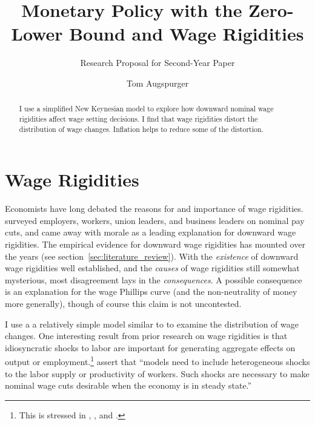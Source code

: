 \documentclass[12pt,a4paper]{scrartcl}            %
\begin{document}
\makeatletter
\def\blfootnote{\xdef\@thefnmark{}\@footnotetext}
\makeatother



\title{Monetary Policy with the Zero-Lower Bound and Wage Rigidities}
\subtitle{Research Proposal for Second-Year Paper}
\author{Tom Augspurger}                               %


\begin{abstract}
I use a simplified New Keynesian model to explore how downward nominal wage rigidities affect wage setting decisions.
I find that wage rigidities distort the distribution of wage changes.
Inflation helps to reduce some of the distortion.

\end{abstract}

\section{Wage Rigidities}
\label{sec:introduction}

Economists have long debated the reasons for and importance of wage rigidities.
\cite{bewley_2007} surveyed employers, workers, union leaders, and business leaders on nominal pay cuts, and came away with morale as a leading explanation for downward wage rigidities.
The empirical evidence for downward wage rigidities has mounted over the years (see section~\ref{sec:literature_review}).
With the \emph{existence} of downward wage rigidities well established, and the \emph{causes} of wage rigidities still somewhat mysterious, most disagreement lays in the \emph{consequences}.
A possible consequence is an explanation for the wage Phillips curve (and the non-neutrality of money more generally), though of course this claim is not uncontested. %

I use a a relatively simple model similar to \cite{daly_hobijn_2013} to examine the distribution of wage changes.  %
One interesting result from prior research on wage rigidities is that idiosyncratic shocks to labor are important for generating aggregate effects on output or employment.\footnote{
This is stressed in \cite{elsby_2009}, \cite{benigno_ricci_2011}, and \cite{daly_hobijn_2013}.}
\cite{daly_hobijn_2013} assert that ``models need to include heterogeneous shocks to the labor supply or productivity of workers. Such shocks are necessary to make nominal wage cuts desirable when the economy is in steady state.''
\end{document}
